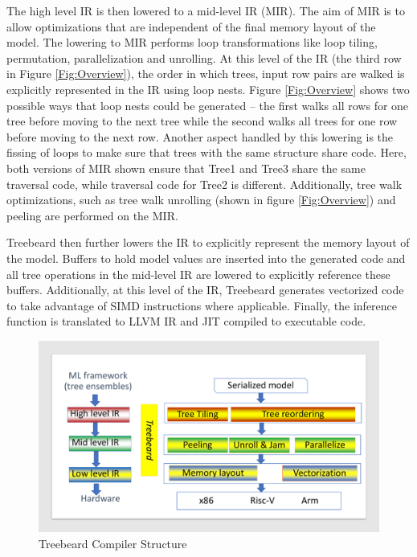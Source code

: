 The high level IR is then lowered to a mid-level IR (MIR). The aim of MIR is 
to allow optimizations that are independent of the final memory layout of the model. 
The lowering to MIR performs loop transformations like loop tiling, permutation, parallelization and unrolling.
At this level of the IR (the third row in Figure \ref{Fig:Overview}),
the order in which trees, input row pairs are walked is explicitly represented in the IR using loop nests.
Figure \ref{Fig:Overview} shows two possible ways that loop nests could be generated -- the first
walks all rows for one tree before moving to the next tree while the second walks all trees for 
one row before moving to the next row. Another aspect handled by this lowering is the fissing of 
loops to make sure that trees with the same structure share code. Here, both versions of MIR shown 
ensure that Tree1 and Tree3 share the same traversal code, while traversal code for Tree2 is different.
Additionally, tree walk optimizations, such as tree walk unrolling (shown in figure \ref{Fig:Overview}) and 
peeling are performed on the MIR.

Treebeard then further lowers the IR to explicitly represent the memory layout of the model. Buffers to hold model 
values are inserted into the generated code and all tree operations in the mid-level IR are lowered to explicitly 
reference these buffers. Additionally, at this level of the IR, Treebeard generates vectorized code to take 
advantage of SIMD instructions where applicable. Finally, the inference function is translated to LLVM IR and 
JIT compiled to executable code. 


\begin{figure}
  \centering
  \includegraphics[width=\linewidth]{figures/compiler.pdf}
  \caption{Treebeard Compiler Structure}
  \label{Fig:CompilerStructure}
\end{figure}

